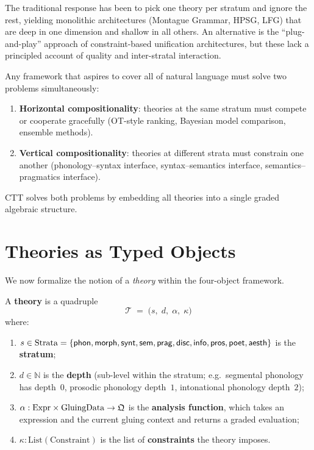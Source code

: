 The traditional response has been to pick one theory per stratum and
ignore the rest, yielding monolithic architectures (Montague Grammar,
HPSG, LFG) that are deep in one dimension and shallow in all others.
An alternative is the ``plug-and-play'' approach of constraint-based
unification architectures, but these lack a principled account of
quality and inter-stratal interaction.

\begin{remark}
\label{rem:modularity}
Any framework that aspires to cover all of natural language must solve
two problems simultaneously:
\begin{enumerate}[label=(\roman*)]
\item \textbf{Horizontal compositionality}: theories at the same
  stratum must compete or cooperate gracefully (OT-style ranking,
  Bayesian model comparison, ensemble methods).
\item \textbf{Vertical compositionality}: theories at different
  strata must constrain one another (phonology--syntax interface,
  syntax--semantics interface, semantics--pragmatics interface).
\end{enumerate}
CTT solves both problems by embedding all theories into a single
graded algebraic structure.
\end{remark}

\section{Theories as Typed Objects}
\label{sec:theory-typed}

We now formalize the notion of a \emph{theory} within the
four-object framework.

\begin{definition}[Theory]
\label{def:theory}
A \textbf{theory} is a quadruple
\[
  \mathcal{T} \;=\; \bigl(s,\; d,\; \alpha,\; \kappa\bigr)
\]
where:
\begin{enumerate}[label=(\alph*)]
\item $s \in \mathrm{Strata} = \{\mathsf{phon}, \mathsf{morph}, \mathsf{synt}, \mathsf{sem}, \mathsf{prag},
  \mathsf{disc}, \mathsf{info}, \mathsf{pros}, \mathsf{poet}, \mathsf{aesth}\}$ is the \textbf{stratum};
\item $d \in \mathbb{N}$ is the \textbf{depth} (sub-level within the
  stratum; e.g.\ segmental phonology has depth~$0$, prosodic
  phonology depth~$1$, intonational phonology depth~$2$);
\item $\alpha : \mathrm{Expr} \times \mathrm{GluingData}
  \to \mathfrak{Q}$ is the \textbf{analysis function}, which takes an
  expression and the current gluing context and returns a graded
  evaluation;
\item $\kappa : \mathrm{List}(\mathrm{Constraint})$ is the list of
  \textbf{constraints} the theory imposes.
\end{enumerate}
\end{definition}


